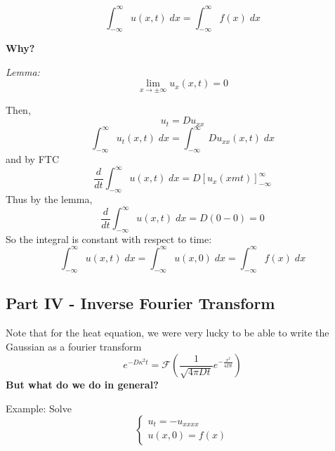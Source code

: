 \documentclass[12pt]{article}
\newcommand{\F}{\mathcal{F}}
\begin{document}
\[\int_{-\infty}^\infty u(x, t)\; dx =\int_{-\infty}^\infty f(x) \; dx \]

\textbf{Why?}

\emph{Lemma:} 
\[\lim_{x \to \pm \infty} u_x(x, t) = 0\]

Then,
\[u_t = Du_{xx}\]
\[\int_{-\infty}^\infty u_t(x, t)\; dx = \int_{-\infty}^\infty Du_{xx}(x, t)\; dx\]
and by FTC 
\[\frac{d}{dt}\int_{-\infty}^\infty u(x, t) \; dx = D\left[u_x(xm t)\right]_{-\infty}^\infty\]
Thus by the lemma,
\[\frac{d}{dt}\int_{-\infty}^\infty u(x, t) \; dx = D(0- 0) = 0\]
So the integral is constant with respect to time:
\[\int_{-\infty}^\infty u(x, t) \; dx = \int_{-\infty}^\infty u(x, 0) \; dx =\int_{-\infty}^\infty f(x) \; dx\]

\subsection*{Part IV - Inverse Fourier Transform}
Note that for the heat equation, we were very lucky to be able to write the Gaussian as a fourier transform
\[e^{-D\kappa^2t} = \F\left(\frac{1}{\sqrt{4\pi Dt}}e^{-\frac{x^2}{4Dt}}\right)\]
\textbf{But what do we do in general?}

Example: Solve 
\[\begin{cases}
    u_t = -u_{xxxx}\\
    u(x, 0) = f(x)
\end{cases}\]
\end{document}
